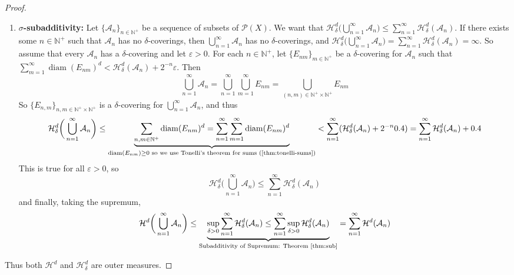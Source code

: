 \documentclass{article}
\theoremstyle{plain}
\theoremstyle{definition}
\DeclareMathOperator{\diam}{diam}
\theoremstyle{remark}
\begin{document}
\begin{proof}
\begin{enumerate}
        \item \textbf{$\sigma$-subadditivity:} Let $\{\mathcal{A}_n\}_{n\in \mathbb{N}^+}$ be a sequence of subsets of $\mathcal{P}(X)$. We want that $\mathcal{H}^d _\delta \bigg(\bigcup \limits _{n=1}^\infty \mathcal{A}_n\bigg) \le \sum \limits _{n=1} ^\infty \mathcal{H}^d_\delta (\mathcal{A}_n)$. 
        If there exists some $n \in \mathbb{N}^+$ such that $\mathcal{A}_n$ has no $\delta$-coverings, then $\bigcup \limits _{n=1}^{\infty} \mathcal{A}_n$ has no $\delta$-coverings, and $\mathcal{H}^d _\delta \bigg(\bigcup \limits _{n=1}^\infty\mathcal{A}_n\bigg) = \sum \limits _{n=1} ^\infty \mathcal{H}^d_\delta (\mathcal{A}_n)= \infty$. So assume that every $\mathcal{A}_n$ has a $\delta$-covering and
        let $\varepsilon>0$. For each $n\in \mathbb{N}^+$, let $\{E_{nm}\}_{m\in \mathbb{N}^+}$ be a $\delta$-covering for $\mathcal{A}_n$ such that $\sum \limits _{m =1}^\infty\diam (E_{nm})^d <\mathcal{H}_{\delta} ^d(\mathcal{A}_n) + 2^{-n}\varepsilon$. Then 
        \[\bigcup \limits _{n=1}^\infty \mathcal{A}_n = \bigcup \limits _{n=1} ^ \infty \bigcup \limits _{m=1}^\infty E_{nm} = \bigcup \limits _{(n,m) \in \mathbb{N}^+ \times \mathbb{N}^+}E_{nm} \]So $\{E_{n,m}\}_{n,m \in \mathbb{N}^+ \times \mathbb{N}^+}$ is a $\delta$-covering for $\bigcup \limits _{n=1}^{\infty} \mathcal{A}_n$, and thus
          \[\mathcal{H}_\delta ^d\bigg(\bigcup \limits _{n=1}^\infty \mathcal{A}_n\bigg) \le \underbrace{\sum \limits _{n,m \in \mathbb{N}^+} \diam (E_{nm})^d = \sum \limits _{n=1}^\infty \sum \limits _{m =1}^\infty  \diam (E_{nm})^d}_{\diam (E_{nm}) \ge 0 \text{ so we use Tonelli's theorem for sums (\ref{thm:tonelli-sums})}} <\sum \limits _{n=1} ^\infty (\mathcal{H}_{\delta }^d(\mathcal{A}_n)+2^{-n}\varepsilon )=\sum \limits _{n=1}^\infty \mathcal{H}_\delta ^d(\mathcal{A}_n)+\varepsilon\] 
        This is true for all $\varepsilon>0$, so \[
        \mathcal{H}_\delta ^d\bigg(\bigcup \limits _{n=1}^\infty \mathcal{A}_n\bigg)  \le \sum \limits _{n=1}^\infty \mathcal{H}_\delta ^d(\mathcal{A}_n)
        \]
        and finally, taking the supremum,  \[\mathcal{H}^d \bigg(\bigcup \limits _{n=1}^\infty \mathcal{A}_n\bigg)\le \underbrace{\sup \limits _{\delta >0}\sum \limits _{n=1}^\infty \mathcal{H}^d _\delta(\mathcal{A}_n) \le \sum \limits _{n=1}^\infty \sup \limits _{\delta >0} \mathcal{H}_\delta ^d(\mathcal{A}_n)}_{\text{Subadditivity of Supremum: Theorem \ref{thm:sub}}} = \sum \limits _{n=1}^\infty \mathcal{H}^d(\mathcal{A}_n)\]
    \end{enumerate}
    Thus both $\mathcal{H}^d$ and $\mathcal{H}^d_\delta$ are outer measures.
\end{proof}
\end{document}
